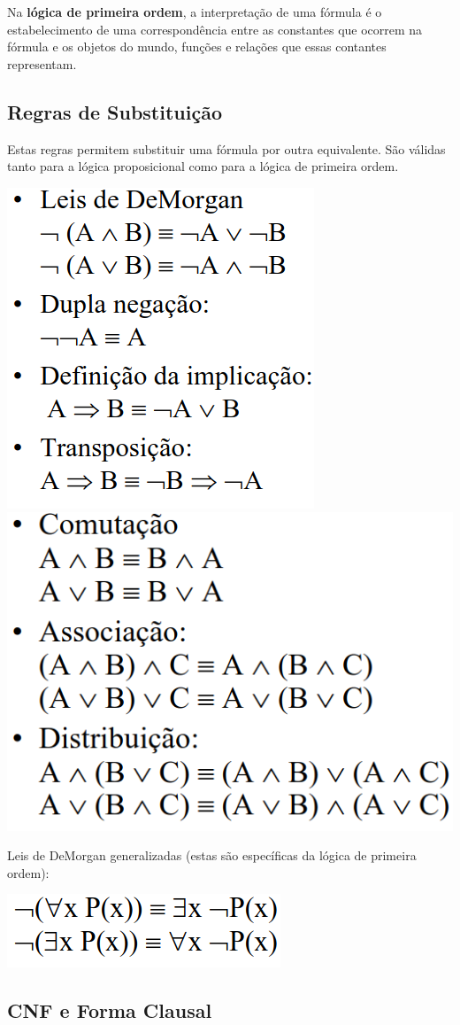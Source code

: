 \documentclass{article}
\begin{document}
Na \textbf{lógica de primeira ordem}, a interpretação de uma fórmula é o estabelecimento de uma
correspondência entre as constantes que ocorrem na fórmula e os objetos do mundo, funções e
relações que essas contantes representam.

\subsection{Regras de Substituição}

Estas regras permitem substituir uma fórmula por outra equivalente.
São válidas tanto para a lógica proposicional como para a lógica de primeira ordem.

\begin{center}
  \includegraphics[scale=0.35]{28}
  \includegraphics[scale=0.35]{29}
\end{center}

Leis de DeMorgan generalizadas (estas são específicas
da lógica de primeira ordem):

\begin{center}
  \includegraphics[scale=0.35]{30}
\end{center}

\subsection{CNF e Forma Clausal}
\end{document}
